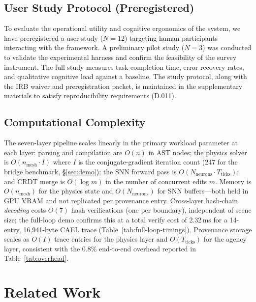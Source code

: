 \documentclass[sigchi-a]{acmart}
\begin{document}


\subsection{User Study Protocol (Preregistered)}
\label{sec:user-study}

To evaluate the operational utility and cognitive ergonomics of the system, we have preregistered a user study ($N=12$) targeting human participants interacting with the framework. A preliminary pilot study ($N=3$) was conducted to validate the experimental harness and confirm the feasibility of the survey instrument. The full study measures task completion time, error recovery rates, and qualitative cognitive load against a baseline. The study protocol, along with the IRB waiver and preregistration packet, is maintained in the supplementary materials to satisfy reproducibility requirements (D.011).

\subsection{Computational Complexity}
\label{sec:eval:complexity}

The seven-layer pipeline scales linearly in the primary workload parameter at
each layer: parsing and compilation are $O(n)$ in AST nodes; the physics solver
is $O(n_{\text{mesh}} \cdot I)$ where $I$ is the conjugate-gradient iteration
count (247 for the bridge benchmark, \S\ref{sec:demo}); the SNN forward pass is
$O(N_{\text{neurons}} \cdot T_{\text{ticks}})$; and CRDT merge is $O(\log m)$
in the number of concurrent edits $m$. Memory is $O(n_{\text{mesh}})$ for the
physics state and $O(N_{\text{neurons}})$ for SNN buffers---both held in GPU
VRAM and not replicated per provenance entry. Cross-layer hash-chain
\emph{decoding} costs $O(7)$ hash verifications (one per boundary), independent
of scene size; the full-loop demo confirms this at a total verify cost of
2.32\,ms for a 14-entry, 16{,}941-byte CAEL trace
(Table~\ref{tab:full-loop-timings}). Provenance storage scales as $O(I)$ trace
entries for the physics layer and $O(T_{\text{ticks}})$ for the agency layer,
consistent with the 0.8\% end-to-end overhead reported in
Table~\ref{tab:overhead}.

\section{Related Work}
\label{sec:related}
\end{document}
